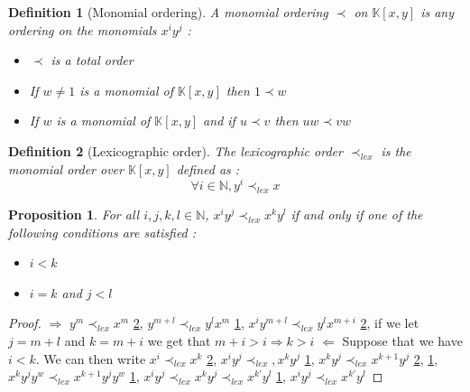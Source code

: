 \documentclass{article}
\newtheorem{definition}{Definition}[section]
\newtheorem{proposition}{Proposition}[section]
\begin{document}
\begin{definition}[Monomial ordering]\label{def:monomial-order}
    A monomial ordering $\prec$ on $\mathbb{K}[x, y]$ is any ordering on the monomials $x^{i}y^{j}$ : 
    \begin{itemize}
        \item $\prec$ is a total order
        \item If $w \neq 1$ is a monomial of $\mathbb{K}[x, y]$ then $1 \prec w$
        \item If $w$ is a monomial of $\mathbb{K}[x, y]$ and if $u \prec v$ then $uw \prec vw$
    \end{itemize}
\end{definition}

\begin{definition}[Lexicographic order]\label{def:lexicographic-order}
    The lexicographic order $\prec_{lex}$ is the monomial order over $\mathbb{K}[x, y]$ defined as : 
    \begin{displaymath}
        \forall i \in \mathbb{N}, y^{i} \prec_{lex} x
    \end{displaymath}
\end{definition}

\begin{proposition}
    For all $i, j, k, l \in \mathbb{N}$, $x^{i}y^{j} \prec_{lex} x^{k}y^{l}$ if and only if one of the following conditions are satisfied : 
    \begin{itemize}
        \item $i < k$
        \item $i = k$ and $j < l$
    \end{itemize}
\end{proposition}

\begin{proof}
    $\Rightarrow$ \newline
    $y^{m} \prec_{lex} x^{m}$ \ref{def:lexicographic-order},
    $y^{m+l} \prec_{lex} y^{l}x^{m}$ \ref{def:monomial-order},
    $x^{i}y^{m+l} \prec_{lex} y^{l}x^{m+i}$ \ref{def:lexicographic-order},
    if we let $j = m+l$ and $ k = m + i$ we get that $m+i>i \Rightarrow k > i$ \newline
    $\Leftarrow$ Suppose that we have $i<k$. We can then write 
    \newline
    $x^{i}\prec_{lex} x^{k}$ \ref{def:lexicographic-order},
    $x^{i}y^{j}\prec_{lex},
    x^{k}y^{j}$ \ref{def:monomial-order},
    $x^{k}y^{j} \prec_{lex} x^{k+1}y^{j} $ \ref{def:lexicographic-order}, \ref{def:monomial-order},
    $x^{k}y^{j}y^{w} \prec_{lex} x^{k+1}y^{j}y^{w} $ \ref{def:monomial-order},
    $x^{i}y^{j}\prec_{lex}x^{k}y^{j}\prec_{lex} x^{k'}y^{l} $ \ref{def:monomial-order},
    $x^{i}y^{j}\prec_{lex} x^{k'}y^{l} $
    
    
\end{proof}
\end{document}
